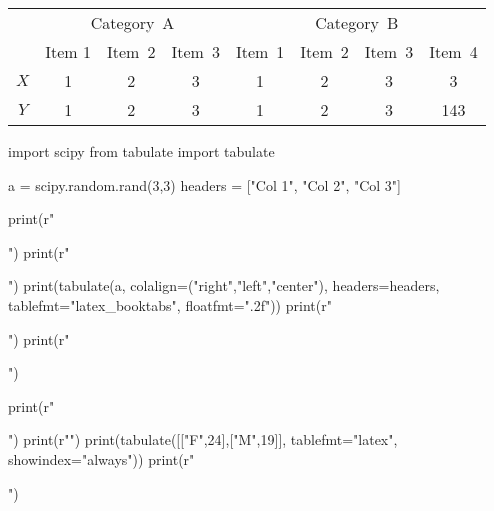 \begin{tabular}{c@{\qquad}ccc@{\qquad}cccc}
	\toprule
	\multirow{2}{*}{\raisebox{-\heavyrulewidth}{Title}} & \multicolumn{3}{c}{Category~A} & \multicolumn{4}{c}{Category~B} \\
	\cmidrule{2-8}
	& Item 1 & Item~2 & Item~3 & Item~1 & Item~2 & Item~3 & Item~4 \\
	\midrule
	$X$ & 1 & 2 & 3 & 1 & 2 & 3 & 3 \\
	$Y$ & 1 & 2 & 3 & 1 & 2 & 3 & 143 \\
	\bottomrule
\end{tabular}

\begin{pycode} 
	import scipy
	from tabulate import tabulate
	
	a = scipy.random.rand(3,3)
	headers = ["Col 1", "Col 2", "Col 3"]
	
	print(r"\begin{table}[H]")
	print(r"\begin{center}")
	print(tabulate(a, colalign=("right","left","center"), headers=headers, tablefmt="latex_booktabs", floatfmt=".2f"))
	print(r"\end{center}")
	print(r"\end{table}")
	
	print(r"\begin{table}[H]")
	print(r"\centering")
	print(tabulate([["F",24],["M",19]], tablefmt="latex", showindex="always"))
	print(r"\end{table}")
\end{pycode}

